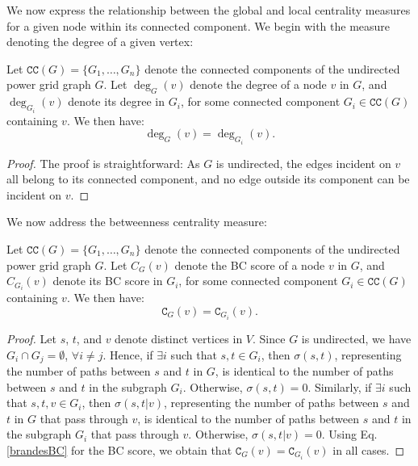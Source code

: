 We now express the relationship between the global and local centrality measures for a given node within its connected component. We begin with the measure denoting the degree of a given vertex:
\begin{proposition}
Let $\mathtt{CC}(G) = \{G_1, \ldots, G_n\}$ denote the connected components of the undirected power grid graph $G$. Let $\deg_{G}(v)$ denote the degree of a node $v$ in $G$, and $\deg_{G_i}(v)$ denote its degree in $G_i$, for some connected component $G_i \in \mathtt{CC}(G)$ containing $v$. We then have:
\begin{equation*}
\deg_{G}(v) = \deg_{G_i}(v).
\end{equation*}
\label{degs}
\end{proposition}
\begin{proof}
The proof is straightforward: As $G$ is undirected, the edges incident on $v$ all belong to its connected component, and no edge outside its component can be incident on $v$.
\end{proof}
We now address the betweenness centrality measure: 
\begin{proposition}
Let $\mathtt{CC}(G) = \{G_1, \ldots, G_n\}$ denote the connected components of the undirected power grid graph $G$. Let $C_{G}(v)$ denote the BC score of a node $v$ in $G$, and $C_{G_i}(v)$ denote its BC score in $G_i$, for some connected component $G_i \in \mathtt{CC}(G)$ containing $v$. We then have:
\begin{equation*}
\mathtt{C}_{G}(v) = \mathtt{C}_{G_i}(v).
\end{equation*}
\label{BCs}
\end{proposition}
\begin{proof}
Let $s$, $t$, and $v$ denote distinct vertices in $V$. Since $G$ is undirected, we have $G_i \cap G_j = \emptyset$, $\forall i \neq j$. Hence, if $\exists i$ such that $s, t \in G_i$, then $\sigma(s,t)$, representing the number of paths between $s$ and $t$ in $G$, is identical to the number of paths between $s$ and $t$ in the subgraph $G_i$. Otherwise, $\sigma(s,t) = 0$. Similarly, if $\exists i$ such that $s, t, v \in G_i$, then $\sigma(s,t \left \vert \right. v)$, representing the number of paths between $s$ and $t$ in $G$ that pass through $v$, is identical to the number of paths between $s$ and $t$ in the subgraph $G_i$ that pass through $v$. Otherwise, $\sigma(s,t \left \vert \right. v) = 0$. Using Eq. \ref{brandesBC} for the BC score, we obtain that $\mathtt{C}_{G}(v) = \mathtt{C}_{G_i}(v)$ in all cases.
\end{proof}



